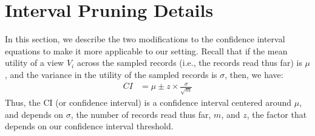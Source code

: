 
\section{Interval Pruning Details}
In this section, we describe the two modifications to 
the confidence interval equations to make it more applicable to our setting.
Recall that if the mean utility of a view $V_i$ across the sampled records 
(i.e., the records read thus far) is $\mu$,
and the variance in the utility of the sampled records
is $\sigma$, then, we have:
\begin{align}
CI & = \mu \pm z \times \frac{\sigma}{\sqrt{m}}
\end{align}
Thus, the CI (or confidence interval) is 
a confidence interval centered around $\mu$, 
and depends on $\sigma$, the number of records
read thus far, $m$,
and $z$, the factor that depends on our confidence interval threshold.


